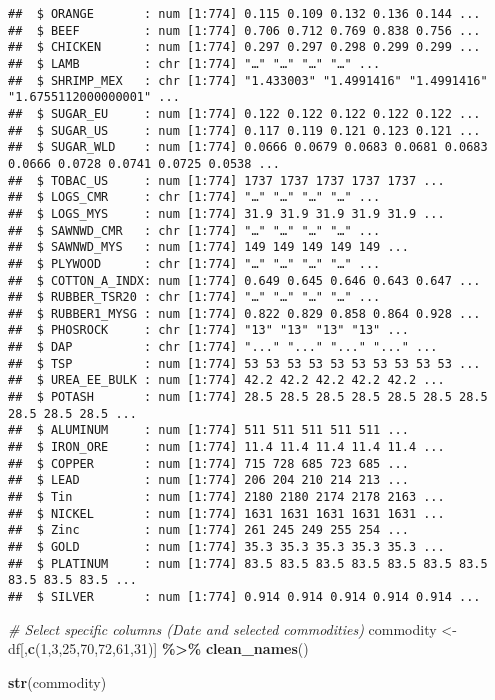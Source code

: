 \documentclass[
]{article}
\newenvironment{Shaded}{\begin{snugshade}}{\end{snugshade}}
\newcommand{\CommentTok}[1]{\textcolor[rgb]{0.56,0.35,0.01}{\textit{#1}}}
\newcommand{\DecValTok}[1]{\textcolor[rgb]{0.00,0.00,0.81}{#1}}
\newcommand{\FunctionTok}[1]{\textcolor[rgb]{0.13,0.29,0.53}{\textbf{#1}}}
\newcommand{\NormalTok}[1]{#1}
\newcommand{\OtherTok}[1]{\textcolor[rgb]{0.56,0.35,0.01}{#1}}
\newcommand{\SpecialCharTok}[1]{\textcolor[rgb]{0.81,0.36,0.00}{\textbf{#1}}}
\begin{document}
\begin{verbatim}
##  $ ORANGE       : num [1:774] 0.115 0.109 0.132 0.136 0.144 ...
##  $ BEEF         : num [1:774] 0.706 0.712 0.769 0.838 0.756 ...
##  $ CHICKEN      : num [1:774] 0.297 0.297 0.298 0.299 0.299 ...
##  $ LAMB         : chr [1:774] "…" "…" "…" "…" ...
##  $ SHRIMP_MEX   : chr [1:774] "1.433003" "1.4991416" "1.4991416" "1.6755112000000001" ...
##  $ SUGAR_EU     : num [1:774] 0.122 0.122 0.122 0.122 0.122 ...
##  $ SUGAR_US     : num [1:774] 0.117 0.119 0.121 0.123 0.121 ...
##  $ SUGAR_WLD    : num [1:774] 0.0666 0.0679 0.0683 0.0681 0.0683 0.0666 0.0728 0.0741 0.0725 0.0538 ...
##  $ TOBAC_US     : num [1:774] 1737 1737 1737 1737 1737 ...
##  $ LOGS_CMR     : chr [1:774] "…" "…" "…" "…" ...
##  $ LOGS_MYS     : num [1:774] 31.9 31.9 31.9 31.9 31.9 ...
##  $ SAWNWD_CMR   : chr [1:774] "…" "…" "…" "…" ...
##  $ SAWNWD_MYS   : num [1:774] 149 149 149 149 149 ...
##  $ PLYWOOD      : chr [1:774] "…" "…" "…" "…" ...
##  $ COTTON_A_INDX: num [1:774] 0.649 0.645 0.646 0.643 0.647 ...
##  $ RUBBER_TSR20 : chr [1:774] "…" "…" "…" "…" ...
##  $ RUBBER1_MYSG : num [1:774] 0.822 0.829 0.858 0.864 0.928 ...
##  $ PHOSROCK     : chr [1:774] "13" "13" "13" "13" ...
##  $ DAP          : chr [1:774] "..." "..." "..." "..." ...
##  $ TSP          : num [1:774] 53 53 53 53 53 53 53 53 53 53 ...
##  $ UREA_EE_BULK : num [1:774] 42.2 42.2 42.2 42.2 42.2 ...
##  $ POTASH       : num [1:774] 28.5 28.5 28.5 28.5 28.5 28.5 28.5 28.5 28.5 28.5 ...
##  $ ALUMINUM     : num [1:774] 511 511 511 511 511 ...
##  $ IRON_ORE     : num [1:774] 11.4 11.4 11.4 11.4 11.4 ...
##  $ COPPER       : num [1:774] 715 728 685 723 685 ...
##  $ LEAD         : num [1:774] 206 204 210 214 213 ...
##  $ Tin          : num [1:774] 2180 2180 2174 2178 2163 ...
##  $ NICKEL       : num [1:774] 1631 1631 1631 1631 1631 ...
##  $ Zinc         : num [1:774] 261 245 249 255 254 ...
##  $ GOLD         : num [1:774] 35.3 35.3 35.3 35.3 35.3 ...
##  $ PLATINUM     : num [1:774] 83.5 83.5 83.5 83.5 83.5 83.5 83.5 83.5 83.5 83.5 ...
##  $ SILVER       : num [1:774] 0.914 0.914 0.914 0.914 0.914 ...
\end{verbatim}

\begin{Shaded}
\begin{Highlighting}[]
\CommentTok{\# Select specific columns (Date and selected commodities)}
\NormalTok{commodity }\OtherTok{\textless{}{-}}\NormalTok{ df[,}\FunctionTok{c}\NormalTok{(}\DecValTok{1}\NormalTok{,}\DecValTok{3}\NormalTok{,}\DecValTok{25}\NormalTok{,}\DecValTok{70}\NormalTok{,}\DecValTok{72}\NormalTok{,}\DecValTok{61}\NormalTok{,}\DecValTok{31}\NormalTok{)] }\SpecialCharTok{\%\textgreater{}\%}
  \FunctionTok{clean\_names}\NormalTok{()}

\FunctionTok{str}\NormalTok{(commodity)}
\end{Highlighting}
\end{Shaded}
\end{document}
